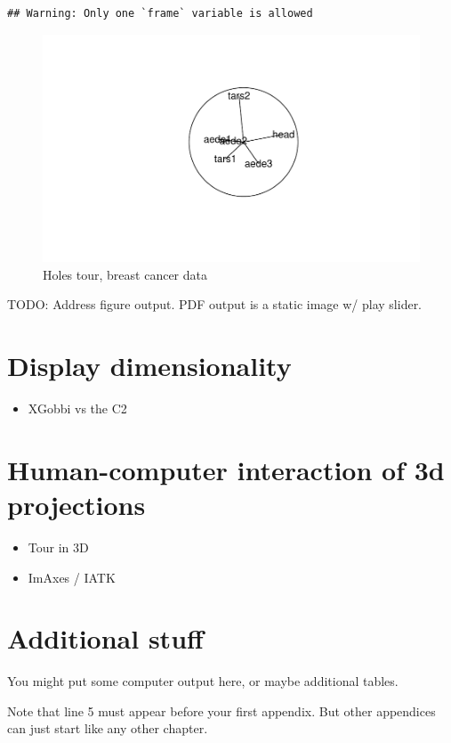\documentclass{monashthesis}
\begin{document}
\begin{verbatim}
## Warning: Only one `frame` variable is allowed
\end{verbatim}

\begin{figure}
\centering
\includegraphics{thesis_files/figure-latex/unnamed-chunk-3-1.pdf}
\caption{\label{fig:unnamed-chunk-3}Holes tour, breast cancer data}
\end{figure}

TODO: Address figure output. PDF output is a static image w/ play
slider.

\chapter{Display dimensionality}\label{ch:disp_dim}

\begin{itemize}
\tightlist
\item
  XGobbi vs the C2
\end{itemize}

\chapter{Human-computer interaction of 3d
projections}\label{ch:hci_3dproj}

\begin{itemize}
\tightlist
\item
  Tour in 3D
\item
  ImAxes / IATK
\end{itemize}

\appendix

\chapter{Additional stuff}\label{additional-stuff}

You might put some computer output here, or maybe additional tables.

Note that line 5 must appear before your first appendix. But other
appendices can just start like any other chapter.

\printbibliography[heading=bibintoc]
\end{document}
